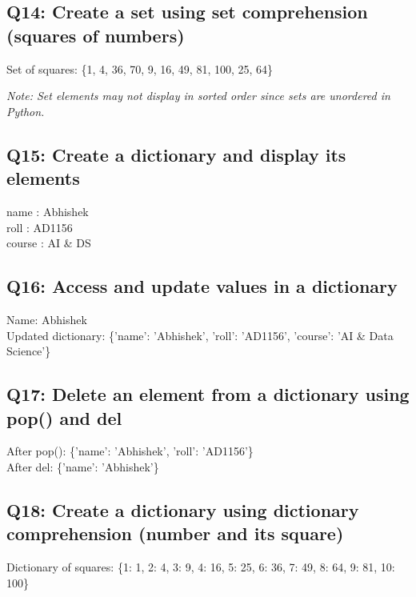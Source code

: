 \documentclass[11pt,a4paper]{article}
\begin{document}
\subsection{Q14: Create a set using set comprehension (squares of numbers)}
\begin{outputbox}
Set of squares: \{1, 4, 36, 70, 9, 16, 49, 81, 100, 25, 64\}
\end{outputbox}
\textit{Note: Set elements may not display in sorted order since sets are unordered in Python.}

\subsection{Q15: Create a dictionary and display its elements}
\begin{outputbox}
name : Abhishek\\
roll : AD1156\\
course : AI \& DS
\end{outputbox}

\subsection{Q16: Access and update values in a dictionary}
\begin{outputbox}
Name: Abhishek\\
Updated dictionary: \{'name': 'Abhishek', 'roll': 'AD1156', 'course': 'AI \& Data Science'\}
\end{outputbox}

\subsection{Q17: Delete an element from a dictionary using pop() and del}
\begin{outputbox}
After pop(): \{'name': 'Abhishek', 'roll': 'AD1156'\}\\
After del: \{'name': 'Abhishek'\}
\end{outputbox}

\subsection{Q18: Create a dictionary using dictionary comprehension (number and its square)}
\begin{outputbox}
Dictionary of squares: \{1: 1, 2: 4, 3: 9, 4: 16, 5: 25, 6: 36, 7: 49, 8: 64, 9: 81, 10: 100\}
\end{outputbox}
\end{document}
